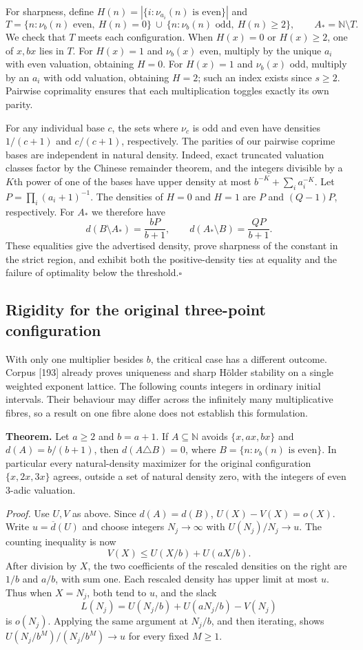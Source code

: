 \documentclass[11pt]{article}
\begin{document}
For sharpness, define $H(n)=|\{i:\nu_{a_i}(n)\text{ is even}\}|$ and
\[
 T=\{n:\nu_b(n)\text{ even},\ H(n)=0\}
 \ \cup\ \{n:\nu_b(n)\text{ odd},\ H(n)\ge2\},
 \qquad A_* = \mathbb N\setminus T.
\]
We check that $T$ meets each configuration. When $H(x)=0$ or $H(x)\ge2$,
one of $x,bx$ lies in $T$. For $H(x)=1$ and $\nu_b(x)$ even, multiply by the unique $a_i$ with even valuation, obtaining $H=0$. For $H(x)=1$ and $\nu_b(x)$ odd, multiply by an $a_i$ with odd valuation, obtaining $H=2$; such an index exists since $s\ge2$. Pairwise coprimality ensures that each multiplication toggles exactly its own parity.

For any individual base $c$, the sets where $\nu_c$ is odd and even have densities $1/(c+1)$ and $c/(c+1)$, respectively. The parities of our pairwise coprime bases are independent in natural density. Indeed, exact truncated valuation classes factor by the Chinese remainder theorem, and the integers divisible by a $K$th power of one of the bases have upper density at most $b^{-K}+\sum_i a_i^{-K}$. Let $P=\prod_i(a_i+1)^{-1}$. The densities of $H=0$ and $H=1$ are $P$ and $(Q-1)P$, respectively. For $A_*$ we therefore have
\[
 d(B\setminus A_*)=\frac{bP}{b+1},\qquad
 d(A_*\setminus B)=\frac{QP}{b+1}.
\]
These equalities give the advertised density, prove sharpness of the constant in the strict region, and exhibit both the positive-density ties at equality and the failure of optimality below the threshold.\hfill$\square$

\subsection*{Rigidity for the original three-point configuration}
With only one multiplier besides $b$, the critical case has a different outcome. Corpus [193] already proves uniqueness and sharp H\"older stability on a single weighted exponent lattice. The following counts integers in ordinary initial intervals. Their behaviour may differ across the infinitely many multiplicative fibres, so a result on one fibre alone does not establish this formulation.
\par\medskip\noindent\textbf{Theorem.}
Let $a\ge2$ and $b=a+1$. If $A\subseteq\mathbb N$ avoids $\{x,ax,bx\}$ and $d(A)=b/(b+1)$, then $d(A\triangle B)=0$, where $B=\{n:\nu_b(n)\text{ is even}\}$. In particular every natural-density maximizer for the original configuration $\{x,2x,3x\}$ agrees, outside a set of natural density zero, with the integers of even $3$-adic valuation.
\par\medskip\noindent\emph{Proof.}
Use $U,V$ as above. Since $d(A)=d(B)$, $U(X)-V(X)=o(X)$. Write $u=\overline d(U)$ and choose integers $N_j\to\infty$ with $U(N_j)/N_j\to u$. The counting inequality is now
\[
 V(X)\le U(X/b)+U(aX/b).
\]
After division by $X$, the two coefficients of the rescaled densities on the right are $1/b$ and $a/b$, with sum one. Each rescaled density has upper limit at most $u$. Thus when $X=N_j$, both tend to $u$, and the slack
\[
 L(N_j)=U(N_j/b)+U(aN_j/b)-V(N_j)
\]
is $o(N_j)$. Applying the same argument at $N_j/b$, and then iterating, shows $U(N_j/b^M)/(N_j/b^M)\to u$ for every fixed $M\ge1$.
\end{document}
